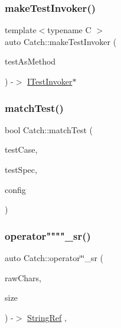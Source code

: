 \mbox{\label{namespace_catch_a82a954c4d70afa716115820dc7dc8d24}} 
\subsubsection{\texorpdfstring{makeTestInvoker()}{makeTestInvoker()}\hspace{0.1cm}{\footnotesize\ttfamily [2/2]}}
{\footnotesize\ttfamily template$<$typename C $>$ \\
auto Catch\+::make\+Test\+Invoker (\begin{DoxyParamCaption}\item[{void(C\+::$\ast$)()}]{test\+As\+Method }\end{DoxyParamCaption}) -\/$>$ \mbox{\hyperlink{struct_catch_1_1_i_test_invoker}{I\+Test\+Invoker}}$\ast$ \hspace{0.3cm}{\ttfamily [noexcept]}}

\mbox{\label{namespace_catch_aadef80fbc6bc84589777a462770cef49}} 
\subsubsection{\texorpdfstring{matchTest()}{matchTest()}}
{\footnotesize\ttfamily bool Catch\+::match\+Test (\begin{DoxyParamCaption}\item[{\mbox{\hyperlink{class_catch_1_1_test_case}{Test\+Case}} const \&}]{test\+Case,  }\item[{Test\+Spec const \&}]{test\+Spec,  }\item[{\mbox{\hyperlink{struct_catch_1_1_i_config}{I\+Config}} const \&}]{config }\end{DoxyParamCaption})}

\mbox{\label{namespace_catch_a56dcfbb436fa40d778e784bf862e78a6}} 
\subsubsection{\texorpdfstring{operator""""\_sr()}{operator""\_sr()}}
{\footnotesize\ttfamily auto Catch\+::operator\char`\"{}\char`\"{}\+\_\+sr (\begin{DoxyParamCaption}\item[{char const $\ast$}]{raw\+Chars,  }\item[{std\+::size\+\_\+t}]{size }\end{DoxyParamCaption}) -\/$>$ \mbox{\hyperlink{class_catch_1_1_string_ref}{String\+Ref}} \hspace{0.3cm}{\ttfamily [inline]}, {\ttfamily [noexcept]}}

